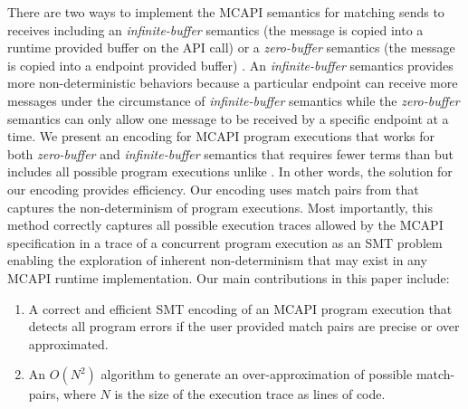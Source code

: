 There are two ways to implement the MCAPI semantics for matching sends to receives including an \textit{infinite-buffer} semantics (the message is copied into a runtime provided buffer on the API call) or a \textit{zero-buffer} semantics (the message is copied into a endpoint provided buffer) \cite{sarvani:fm09}.  An \textit{infinite-buffer} semantics provides more non-deterministic behaviors because a particular endpoint can receive more messages under the circumstance of \textit{infinite-buffer} semantics while the \textit{zero-buffer} semantics can only allow one message to be received by a specific endpoint at a time. We present an encoding for MCAPI program executions that works for both \textit{zero-buffer} and \textit{infinite-buffer} semantics that requires fewer terms than \cite{elwakil:padtad10} but includes all possible program executions unlike \cite{elwakil:padtad10}.  In other words, the solution for our encoding provides efficiency. Our encoding uses match pairs from \cite{sharma:fmcad09} that captures the non-determinism of program executions. Most importantly, this method correctly captures all possible execution traces allowed by the MCAPI specification in a trace of a concurrent program execution as an SMT problem enabling the exploration of inherent non-determinism that may exist in any MCAPI runtime implementation.
Our main contributions in this paper include:

\begin{enumerate}
\item  A correct and efficient SMT encoding of an MCAPI program execution that detects all program errors if the user provided match pairs are precise or over approximated.
\item  An $O(N^2)$ algorithm to generate an over-approximation of possible match-pairs, where $N$ is the size of the execution trace as lines of code.
\end{enumerate}

